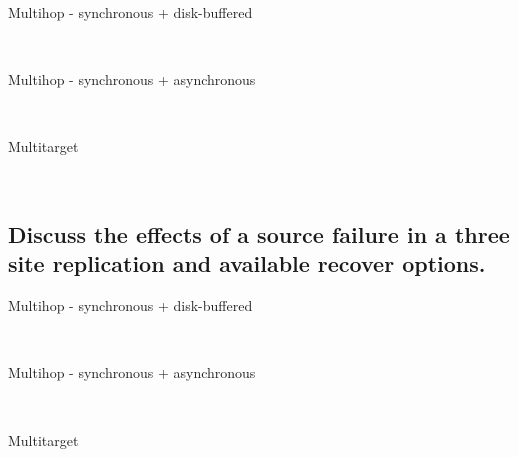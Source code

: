	\begin{description}
		\item[Multihop - synchronous + disk-buffered] \hfill \\
		\item[Multihop - synchronous + asynchronous] \hfill \\
		\item[Multitarget] \hfill \\
	\end{description}


\subsection{Discuss the effects of a source failure in a three site replication and available recover options.} %
\label{sub:discuss_the_effects_of_a_source_failure_in_a_three_site_replication_and_available_recover_options}

	\begin{description}
		\item[Multihop - synchronous + disk-buffered] \hfill \\
		\item[Multihop - synchronous + asynchronous] \hfill \\
		\item[Multitarget] \hfill \\
	\end{description}


